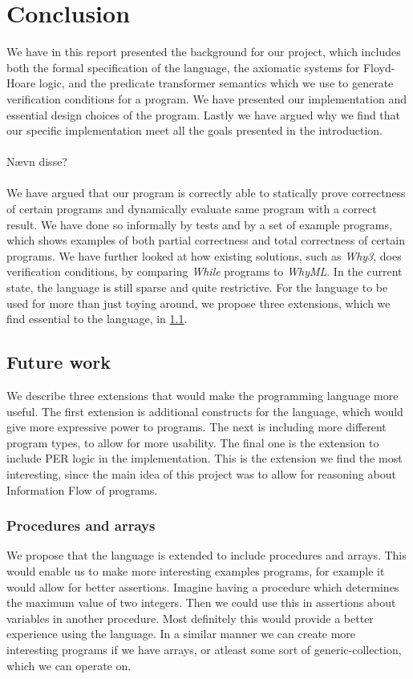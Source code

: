 \section{Conclusion}\label{sec:conclusion}
We have in this report presented the background for our project, which includes both the formal specification of the language, the axiomatic systems for Floyd-Hoare logic, and the predicate transformer semantics which we use to generate verification conditions for a program.
We have presented our implementation and essential design choices of the program.
Lastly we have argued why we find that our specific implementation meet all the goals presented in the introduction.
\\~\\
Nævn disse?
\\~\\
We have argued that our program is correctly able to statically prove correctness of certain programs and dynamically evaluate same program with a correct result. 
We have done so informally by tests and by a set of example programs, which shows examples of both partial correctness and total correctness of certain programs.
We have further looked at how existing solutions, such as \textit{Why3}, does verification conditions, by comparing \textit{While} programs to \textit{WhyML}.
In the current state, the language is still sparse and quite restrictive. 
For the language to be used for more than just toying around, we propose three extensions, which we find essential to the language, in \cref{sec:future}.

\subsection{Future work}\label{sec:future}
We describe three extensions that would make the programming language more useful. 
The first extension is additional constructs for the language, which would give more expressive power to programs. 
The next is including more different program types, to allow for more usability. 
The final one is the extension to include PER logic in the implementation. This is the extension we find the most interesting, since the main idea of this project was to allow for reasoning about Information Flow of programs.

\subsubsection{Procedures and arrays}
We propose that the language is extended to include procedures and arrays. 
This would enable us to make more interesting examples programs, for example it would allow for better assertions. 
Imagine having a procedure which determines the maximum value of two integers. 
Then we could use this in assertions about variables in another procedure. 
Most definitely this would provide a better experience using the language. 
In a similar manner we can create more interesting programs if we have arrays, or atleast some sort of generic-collection, which we can operate on.

